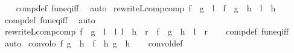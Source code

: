 \begin{isabellebody}
%
\isadelimproof
\ \ %
\endisadelimproof
%
\isatagproof
{}\isamarkupfalse%
\ comp{\isacharunderscore}{\kern0pt}def\ fun{\isacharunderscore}{\kern0pt}eq{\isacharunderscore}{\kern0pt}iff\ \isamarkupfalse%
\ auto%
\endisatagproof
{\isafoldproof}%
%
\isadelimproof
\isanewline
%
\endisadelimproof
\isanewline
{}\isamarkupfalse%
\ rewriteL{\isacharunderscore}{\kern0pt}comp{\isacharunderscore}{\kern0pt}comp{\isacharcolon}{\kern0pt}\ {\isachardoublequoteopen}{\isasymlbrakk}f\ {\isasymcirc}\ g\ {\isacharequal}{\kern0pt}\ l{\isasymrbrakk}\ {\isasymLongrightarrow}\ f\ {\isasymcirc}\ {\isacharparenleft}{\kern0pt}g\ {\isasymcirc}\ h{\isacharparenright}{\kern0pt}\ {\isacharequal}{\kern0pt}\ l\ {\isasymcirc}\ h{\isachardoublequoteclose}\isanewline
%
\isadelimproof
\ \ %
\endisadelimproof
%
\isatagproof
{}\isamarkupfalse%
\ comp{\isacharunderscore}{\kern0pt}def\ fun{\isacharunderscore}{\kern0pt}eq{\isacharunderscore}{\kern0pt}iff\ \isamarkupfalse%
\ auto%
\endisatagproof
{\isafoldproof}%
%
\isadelimproof
\isanewline
%
\endisadelimproof
\isanewline
{}\isamarkupfalse%
\ rewriteL{\isacharunderscore}{\kern0pt}comp{\isacharunderscore}{\kern0pt}comp{}{\isacharcolon}{\kern0pt}\ {\isachardoublequoteopen}{\isasymlbrakk}f\ {\isasymcirc}\ g\ {\isacharequal}{\kern0pt}\ l{}\ {\isasymcirc}\ l{}{\isacharsemicolon}{\kern0pt}\ l{}\ {\isasymcirc}\ h\ {\isacharequal}{\kern0pt}\ r{\isasymrbrakk}\ {\isasymLongrightarrow}\ f\ {\isasymcirc}\ {\isacharparenleft}{\kern0pt}g\ {\isasymcirc}\ h{\isacharparenright}{\kern0pt}\ {\isacharequal}{\kern0pt}\ l{}\ {\isasymcirc}\ r{\isachardoublequoteclose}\isanewline
%
\isadelimproof
\ \ %
\endisadelimproof
%
\isatagproof
{}\isamarkupfalse%
\ comp{\isacharunderscore}{\kern0pt}def\ fun{\isacharunderscore}{\kern0pt}eq{\isacharunderscore}{\kern0pt}iff\ \isamarkupfalse%
\ auto%
\endisatagproof
{\isafoldproof}%
%
\isadelimproof
\isanewline
%
\endisadelimproof
\isanewline
{}\isamarkupfalse%
\ convol{\isacharunderscore}{\kern0pt}o{\isacharcolon}{\kern0pt}\ {\isachardoublequoteopen}{\isasymlangle}f{\isacharcomma}{\kern0pt}\ g{\isasymrangle}\ {\isasymcirc}\ h\ {\isacharequal}{\kern0pt}\ {\isasymlangle}f\ {\isasymcirc}\ h{\isacharcomma}{\kern0pt}\ g\ {\isasymcirc}\ h{\isasymrangle}{\isachardoublequoteclose}\isanewline
%
\isadelimproof
\ \ %
\endisadelimproof
%
\isatagproof
{}\isamarkupfalse%
\ convol{\isacharunderscore}{\kern0pt}def\ \isamarkupfalse%

\end{isabellebody}
